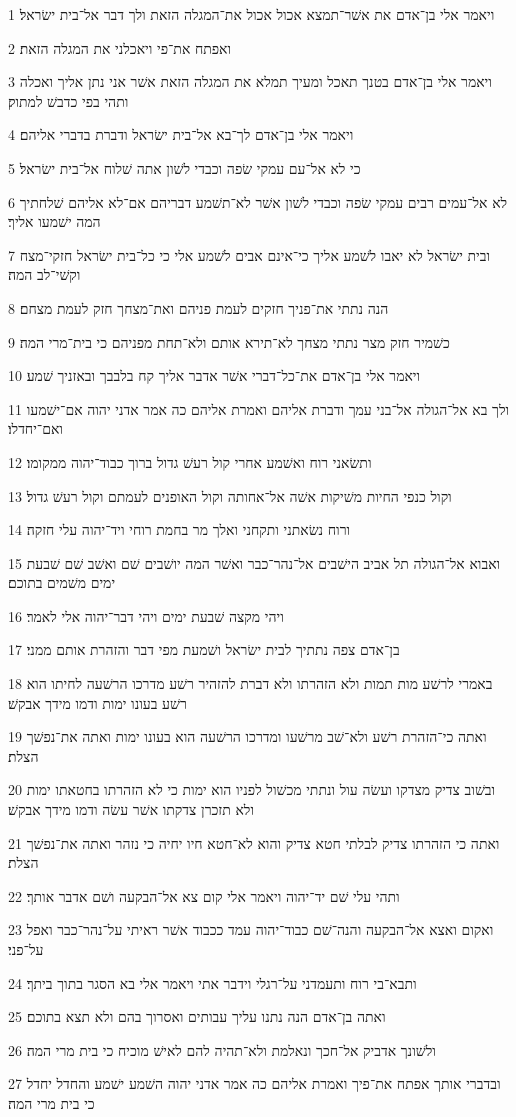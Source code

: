\par 1 ויאמר אלי בן־אדם את אשׁר־תמצא אכול אכול את־המגלה הזאת ולך דבר אל־בית ישׂראל׃
\par 2 ואפתח את־פי ויאכלני את המגלה הזאת׃
\par 3 ויאמר אלי בן־אדם בטנך תאכל ומעיך תמלא את המגלה הזאת אשׁר אני נתן אליך ואכלה ותהי בפי כדבשׁ למתוק׃
\par 4 ויאמר אלי בן־אדם לך־בא אל־בית ישׂראל ודברת בדברי אליהם׃
\par 5 כי לא אל־עם עמקי שׂפה וכבדי לשׁון אתה שׁלוח אל־בית ישׂראל׃
\par 6 לא אל־עמים רבים עמקי שׂפה וכבדי לשׁון אשׁר לא־תשׁמע דבריהם אם־לא אליהם שׁלחתיך המה ישׁמעו אליך׃
\par 7 ובית ישׂראל לא יאבו לשׁמע אליך כי־אינם אבים לשׁמע אלי כי כל־בית ישׂראל חזקי־מצח וקשׁי־לב המה׃
\par 8 הנה נתתי את־פניך חזקים לעמת פניהם ואת־מצחך חזק לעמת מצחם׃
\par 9 כשׁמיר חזק מצר נתתי מצחך לא־תירא אותם ולא־תחת מפניהם כי בית־מרי המה׃
\par 10 ויאמר אלי בן־אדם את־כל־דברי אשׁר אדבר אליך קח בלבבך ובאזניך שׁמע׃
\par 11 ולך בא אל־הגולה אל־בני עמך ודברת אליהם ואמרת אליהם כה אמר אדני יהוה אם־ישׁמעו ואם־יחדלו׃
\par 12 ותשׂאני רוח ואשׁמע אחרי קול רעשׁ גדול ברוך כבוד־יהוה ממקומו׃
\par 13 וקול כנפי החיות משׁיקות אשׁה אל־אחותה וקול האופנים לעמתם וקול רעשׁ גדול׃
\par 14 ורוח נשׂאתני ותקחני ואלך מר בחמת רוחי ויד־יהוה עלי חזקה׃
\par 15 ואבוא אל־הגולה תל אביב הישׁבים אל־נהר־כבר ואשׁר המה יושׁבים שׁם ואשׁב שׁם שׁבעת ימים משׁמים בתוכם׃
\par 16 ויהי מקצה שׁבעת ימים ויהי דבר־יהוה אלי לאמר׃
\par 17 בן־אדם צפה נתתיך לבית ישׂראל ושׁמעת מפי דבר והזהרת אותם ממני׃
\par 18 באמרי לרשׁע מות תמות ולא הזהרתו ולא דברת להזהיר רשׁע מדרכו הרשׁעה לחיתו הוא רשׁע בעונו ימות ודמו מידך אבקשׁ׃
\par 19 ואתה כי־הזהרת רשׁע ולא־שׁב מרשׁעו ומדרכו הרשׁעה הוא בעונו ימות ואתה את־נפשׁך הצלת׃
\par 20 ובשׁוב צדיק מצדקו ועשׂה עול ונתתי מכשׁול לפניו הוא ימות כי לא הזהרתו בחטאתו ימות ולא תזכרן צדקתו אשׁר עשׂה ודמו מידך אבקשׁ׃
\par 21 ואתה כי הזהרתו צדיק לבלתי חטא צדיק והוא לא־חטא חיו יחיה כי נזהר ואתה את־נפשׁך הצלת׃
\par 22 ותהי עלי שׁם יד־יהוה ויאמר אלי קום צא אל־הבקעה ושׁם אדבר אותך׃
\par 23 ואקום ואצא אל־הבקעה והנה־שׁם כבוד־יהוה עמד ככבוד אשׁר ראיתי על־נהר־כבר ואפל על־פני׃
\par 24 ותבא־בי רוח ותעמדני על־רגלי וידבר אתי ויאמר אלי בא הסגר בתוך ביתך׃
\par 25 ואתה בן־אדם הנה נתנו עליך עבותים ואסרוך בהם ולא תצא בתוכם׃
\par 26 ולשׁונך אדביק אל־חכך ונאלמת ולא־תהיה להם לאישׁ מוכיח כי בית מרי המה׃
\par 27 ובדברי אותך אפתח את־פיך ואמרת אליהם כה אמר אדני יהוה השׁמע ישׁמע והחדל יחדל כי בית מרי המה׃

